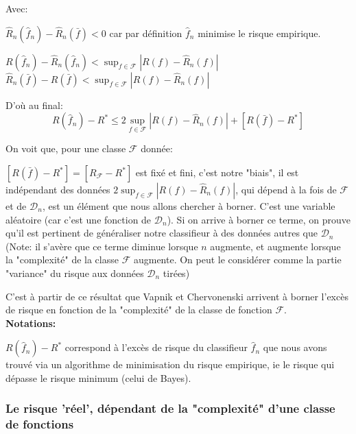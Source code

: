 \documentclass[a4paper]{article}
\theoremstyle{plain}
\begin{document}
Avec:

\begin{outline}

\1 $\hat R_n(\hat f_n) - \hat R_n(\bar f) < 0 $ car par définition $\hat f_n$ minimise le risque empirique.

\1 $R(\hat f_n) - \hat R_n(\hat f_n) < \displaystyle\sup_{f \in \mathcal{F}} |R(f) - \hat R_n(f)| $
\1 $\hat R_n(\bar f) -R(\bar f) < \displaystyle\sup_{f \in \mathcal{F}} |R(f) - \hat R_n(f)|$

\end{outline}

D'où au final:
$$R(\hat f_n) - R^{\ast} \leq 2 \displaystyle\sup_{f \in \mathcal{F}} |R(f) - \hat R_n(f)| + [R(\bar f) - R^{\ast}]$$


On voit que, pour une classe $\mathcal{F}$ donnée:
\begin{outline}
\1 $[R(\bar f) - R^{\ast}] = [R_{\mathcal{F}} - R^{\ast}]$ est fixé et fini, c'est notre "biais", il est indépendant des données
\1 $2 \displaystyle\sup_{f \in \mathcal{F}} |R(f) - \hat R_n(f)|$, qui dépend à la fois de $\mathcal{F}$ et de $\mathcal{D}_n$, est un élément que nous allons chercher à borner. C'est une variable aléatoire (car c'est une fonction de $\mathcal{D}_n$). Si on arrive à borner ce terme, on prouve qu'il est pertinent de généraliser notre classifieur à des données autres que $\mathcal{D}_n$ (Note: il s'avère que ce terme diminue lorsque $n$ augmente, et augmente lorsque la "complexité" de la classe $\mathcal{F}$ augmente. On peut le considérer comme la partie "variance" du risque aux données $\mathcal{D}_n$ tirées) 
\end{outline}

C'est à partir de ce résultat que Vapnik et Chervonenski arrivent à borner l'excès de risque en fonction de la "complexité" de la classe de fonction $\mathcal{F}$.\\

\textbf{Notations:}
\begin{outline}

\1 $R(\hat f_n) - R^{\ast}$ correspond à l'excès de risque du classifieur $\hat f_n$ que nous avons trouvé via un algorithme de minimisation du risque empirique, ie le risque qui dépasse le risque minimum (celui de Bayes).

\end{outline}

\subsubsection{Le risque 'réel', dépendant de la "complexité" d'une classe de fonctions}
\end{document}
